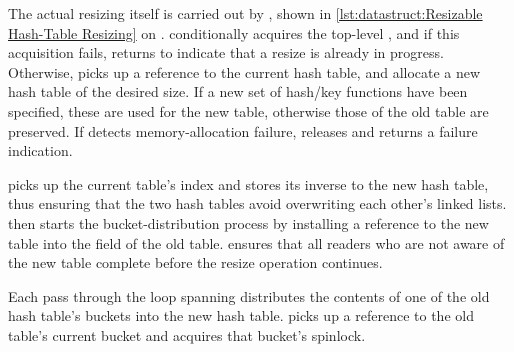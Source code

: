 \begin{fcvref}
The actual resizing itself is carried out by , shown in
\cref{lst:datastruct:Resizable Hash-Table Resizing} on
.
 conditionally acquires the top-level , and if
this acquisition fails,  returns  to indicate that
a resize is already in progress.
Otherwise,  picks up a reference to the current hash table,
and  allocate a new hash table of the desired size.
If a new set of hash/key functions have been specified, these are
used for the new table, otherwise those of the old table are preserved.
If  detects memory-allocation failure,
 releases 
and  returns a failure indication.

 picks up the current table's index and
 stores its inverse to
the new hash table, thus ensuring that the two hash tables avoid overwriting
each other's linked lists.
 then starts the bucket-distribution process by
installing a reference to the new table into the  field of
the old table.
 ensures that all readers who are not aware of the
new table complete before the resize operation continues.

Each pass through the loop spanning  distributes the contents
of one of the old hash table's buckets into the new hash table.
 picks up a reference to the old table's current bucket
and  acquires that bucket's spinlock.
\end{fcvref}

